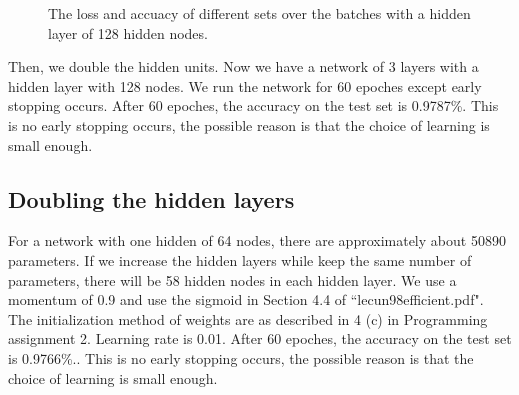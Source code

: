 \documentclass{article} %
\begin{document}
\begin{figure} [!htbp]
	
	\caption{The loss and accuacy of different sets over the batches with a hidden layer of 128 hidden nodes. }  
	
\end{figure}
Then, we double the hidden units. Now we have a network of 3 layers with a hidden layer with 128 nodes. We run the network for 60 epoches except early stopping occurs. After 60 epoches, the accuracy on the test set is 0.9787\%. This is no early stopping occurs, the possible reason is that the choice of learning is small enough.



\subsection{Doubling the hidden layers}
For a network with one hidden of 64 nodes, there are approximately about 50890 parameters. If we increase the hidden layers while keep the same number of parameters, there will be 58 hidden nodes in each hidden layer. We use a momentum of 0.9 and use the sigmoid in Section 4.4 of ``lecun98efficient.pdf". The initialization method of weights are as described in 4 (c) in Programming assignment 2. Learning rate is 0.01. After 60 epoches, the accuracy on the test set is 0.9766\%.. This is no early stopping occurs, the possible reason is that the choice of learning is small enough.
\end{document}
